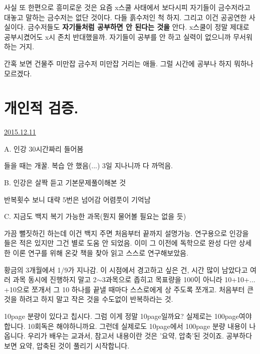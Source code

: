 사실 또 한편으로 흥미로운 것은 요즘 x스쿨 사태에서 보다시피
자기들이 금수저라고 대놓고 말하는 금수저는 없단 것이다. 다들 흙수저인 척 하지.
그리고 이건 공공연한 사실이다. 금수저들도 \textbf{자기들처럼 공부하면 안 된다는 것을} 안다.
x스쿨이 정말 제대로 공부시켰어도 x시 존치 반대했을까. 자기들이 공부를 안 하고 실력이 없으니까 무서워하는 거지.
\vspace{5mm}

간혹 보면 건물주 미만잡 금수저 미만잡 거리는 애들. 그럴 시간에 공부나 하지 뭐하나 모르겠다.
\vspace{5mm}






\section{개인적 검증.}
\href{https://www.kockoc.com/Apoc/540628}{2015.12.11}

\vspace{5mm}

A. 인강 30시간짜리 들어봄
\vspace{5mm}

들을 때는 개꿀.
복습 안 했음(...)
3일 지나니까 다 까먹음.
\vspace{5mm}

B. 인강은 살짝 듣고 기본문제풀이해본 것
\vspace{5mm}

반복횟수 보니 대략 5번은 넘어감
어렴풋이 기억남
\vspace{5mm}

C. 지금도 백지 복기 가능한 과목(뭔지 물어볼 필요는 없을 듯)
\vspace{5mm}

가끔 뻘짓하긴 하는데 이건 백지 주면 처음부터 끝까지 설명가능.
연구용으로 인강을 들은 적은 있지만 그건 별로 도움 안 되었음. 이미 그 이전에 독학으로 완성
다만 상세한 이론 연구를 위해 온갖 책을 찾아 읽고 스스로 연구해보았음.
\vspace{5mm}

황금의 3개월에서 1/9가 지나감.
이 시점에서 경고하고 싶은 건, 시간 많이 남았다고 여러 과목 동시에 진행하지 말고
2$\sim$3과목으로 좁히고 목표량을 100이 아니라 10+10+... +10으로 쪼개서 그 10 하나를 끝낼 때마다 스스로에게 상 주도록 쪼개고.
처음부터 큰 것을 하려고 하지 말고 작은 것을 수도없이 반복하라는 것.
\vspace{5mm}

10page 분량이 있다고 칩시다. 그럼 이게 정말 10page일까요?
실제로는 100page여야합니다. 10회독은 해야하니까요. 그런데 실제로도 10page에서 100page 분량 내용이 나옵니다.
우리가 배우는 교과서, 참고서 내용이란 것은 '요약, 압축'된 것이죠. 공부하다보면 요약, 압축된 것이 풀리기 시작합니다.
\vspace{5mm}


